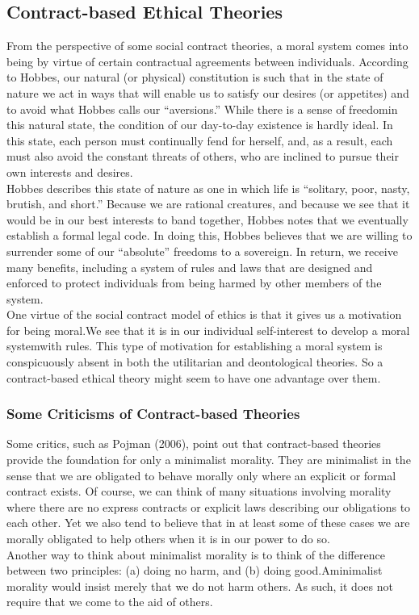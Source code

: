 \documentclass[12pt]{article}
\theoremstyle{definition}
\begin{document}
\subsection{Contract-based Ethical Theories}
From the perspective of some social contract theories, a moral system comes into
being by virtue of certain contractual agreements between individuals.
According to Hobbes, our natural (or physical)
constitution is such that in the state of nature we act in ways that will enable us to satisfy
our desires (or appetites) and to avoid what Hobbes calls our “aversions.” While there is
a sense of freedomin this natural state, the condition of our day-to-day existence is hardly
ideal. In this state, each person must continually fend for herself, and, as a result, each
must also avoid the constant threats of others, who are inclined to pursue their own
interests and desires.\\
Hobbes describes this state of nature as one in which life is “solitary, poor, nasty,
brutish, and short.” Because we are rational creatures, and because we see that it would be in our best interests to band together, Hobbes notes that we eventually establish a
formal legal code. In doing this, Hobbes believes that we are willing to surrender some of
our “absolute” freedoms to a sovereign. In return, we receive many benefits, including a
system of rules and laws that are designed and enforced to protect individuals from being
harmed by other members of the system.\\
One virtue of the social contract model of ethics is that it gives us a motivation for
being moral.We see that it is in our individual self-interest to develop a moral systemwith
rules. This type of motivation for establishing a moral system is conspicuously absent in
both the utilitarian and deontological theories. So a contract-based ethical theory might
seem to have one advantage over them.
\subsubsection{Some Criticisms of Contract-based Theories}
Some critics, such as Pojman (2006), point out that contract-based theories provide the
foundation for only a minimalist morality. They are minimalist in the sense that we are
obligated to behave morally only where an explicit or formal contract exists. Of course, we can think of
many situations involving morality where there are no express contracts or explicit laws
describing our obligations to each other. Yet we also tend to believe that in at least some
of these cases we are morally obligated to help others when it is in our power to do so.\\
Another way to think about minimalist morality is to think of the difference between
two principles: (a) doing no harm, and (b) doing good.Aminimalist morality would insist
merely that we do not harm others. As such, it does not require that we come to the aid of
others.
\end{document}
